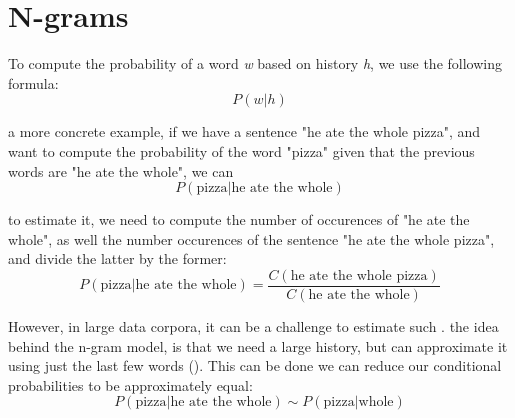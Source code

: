 \section{N-grams}
\label{sec:NgramBackground-Ngrams}
To compute the  probability of a word \textit{w} based on history \textit{h}, we use the following formula:
\begin{equation}
    P(w|h)
\end{equation}

 a more concrete example, if we have a sentence "he ate the whole pizza", and want to compute the probability of the word "pizza" given that the previous words are "he ate the whole", we can 
\begin{equation}
    P(\text{pizza}|\text{he ate the whole})
\end{equation}

to estimate it, we need to compute the number of occurences of "he ate the whole", as well the number occurences of the sentence "he ate the whole pizza", and divide the latter by the former:
\begin{equation}
    P(\text{pizza}|\text{he ate the whole})=\frac{C(\text{he ate the whole pizza})}{C(\text{he ate the whole})}
\end{equation}

However, in large  data corpora, it can be a challenge to estimate such  .  the idea behind the n-gram model, is that we  need a large history, but can approximate it using just the last few words (\cite{Jura09a}). This can be done  we can reduce our conditional probabilities to be approximately equal: 
\begin{equation}
    P(\text{pizza}|\text{he ate the whole}) \sim P(\text{pizza}|\text{whole})
\end{equation}

